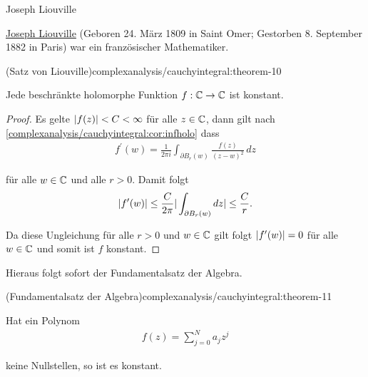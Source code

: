 \begin{emphBox}{Joseph Liouville}{}

\par
\href{https://de.wikipedia.org/wiki/Joseph\_Liouville}{Joseph Liouville} (Geboren 24. März 1809 in Saint Omer; Gestorben 8. September 1882 in Paris) war ein französischer Mathematiker.
\end{emphBox}
\begin{theorem}{(Satz von Liouville)}{complexanalysis/cauchyintegral:theorem-10}



\par
Jede beschränkte holomorphe Funktion \(f:\mathbb{C}\to\mathbb{C}\) ist konstant.
\end{theorem}

\begin{proof}
 Es gelte \(\vert f(z) \vert< C <\infty\) für alle \(z\in\mathbb{C}\), dann gilt nach \cref{complexanalysis/cauchyintegral:cor:infholo}  dass
\begin{align*}
f^\prime(w) = \frac{1}{2\pi i} \int_{\partial B_r(w)} \frac{f(z)}{(z-w)^2}\, dz
\end{align*}
\par
für alle \(w\in \mathbb{C}\) und alle \(r> 0\). Damit folgt
\begin{align*}
\vert f^\prime(w) \vert\leq \frac{C}{2 \pi} \vert \int_{\partial B_r(w)} dz \vert\leq \frac{C}{r}.
\end{align*}
\par
Da diese Ungleichung für alle \(r>0\) und \(w\in\mathbb{C}\) gilt folgt \(\vert f^\prime(w) \vert = 0\) für alle \(w\in\mathbb{C}\) und somit ist \(f\) konstant.
\end{proof}

\par
Hieraus folgt sofort der Fundamentalsatz der Algebra.
\begin{theorem}{(Fundamentalsatz der Algebra)}{complexanalysis/cauchyintegral:theorem-11}



\par
Hat ein Polynom
\begin{align*}
f(z)=\sum_{j=0}^N a_j z^j
\end{align*}
\par
keine Nullstellen, so ist es konstant.
\end{theorem}

